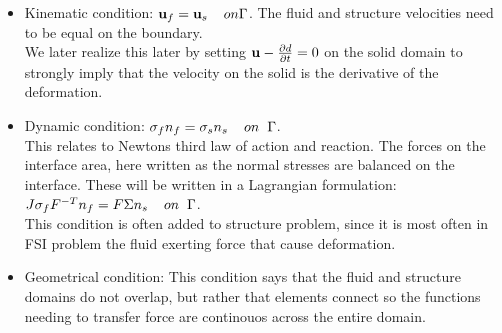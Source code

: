 \begin{itemize}
\item Kinematic condition: $\bold{u}_f = \bold{u}_s  \hspace{4mm} on \Gamma$. The fluid and structure velocities need to be equal on the boundary. \\
We later realize this later by setting  $\bold{u}- \frac{\partial d}{\partial t}  = 0  $ on the solid domain to strongly imply that the velocity on the solid is the derivative of the deformation.  
\item Dynamic condition: $  \sigma_f n_f = \sigma_s n_s \hspace{4mm} on  \hspace{2mm}\Gamma   $. \\
	This relates to Newtons third law of action and reaction. The forces on the interface area, here written as the normal stresses are balanced on the interface. These will be written in a Lagrangian formulation: \\
	$J\sigma_f F^{-T} n_f = F\Sigma n_s \hspace{4mm} on  \hspace{2mm}\Gamma $. \\
	This condition is often added to structure problem, since it is most often in FSI problem the fluid exerting force that cause deformation.
\item Geometrical condition: This condition says that the fluid and structure domains do not overlap, but rather that elements connect so the functions needing to transfer force are continouos across the entire domain.
\end{itemize}

